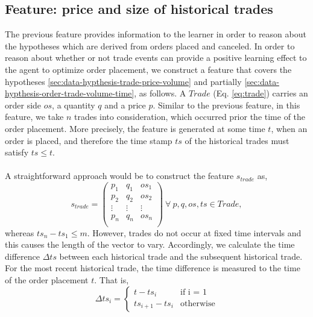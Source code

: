 \subsection{Feature: price and size of historical trades}
\label{sec:data-feature-2}
The previous feature provides information to the learner in order to reason about the hypotheses which are derived from orders placed and canceled.
In order to reason about whether or not trade events can provide a positive learning effect to the agent to optimize order placement, we construct a feature that covers the hypotheses \ref{sec:data-hypthesis-trade-price-volume} and partially \ref{sec:data-hypthesis-order-trade-volume-time}, as follows.
A $Trade$ (Eq. \ref{eq:trade}) carries an order side $os$, a quantity $q$ and a price $p$.
Similar to the previous feature, in this feature, we take $n$ trades into consideration, which occurred prior the time of the order placement.
More precisely, the feature is generated at some time $t$, when an order is placed, and therefore the time stamp $ts$ of the historical trades must satisfy $ts \leq t$.
\\
\\
A straightforward approach would be to construct the feature $s_{trade}$ as,
\begin{equation}
    s_{trade} =\begin{pmatrix}
        p_1 & q_1 & os_1 \\
        p_2 & q_2 & os_2 \\
        \vdots & \vdots & \vdots\\
        p_n & q_n & os_n \\
    \end{pmatrix}
    \ \forall \ p, q, os, ts \in Trade,
\end{equation}
whereas $ts_n - ts_1 \leq m$.
However, trades do not occur at fixed time intervals and this causes the length of the vector to vary.
Accordingly, we calculate the time difference $\Delta{ts}$ between each historical trade and the subsequent historical trade.
For the most recent historical trade, the time difference is measured to the time of the order placement $t$.
That is,
\begin{equation}
    \Delta{ts}_i = \begin{cases}
    t - ts_i &\text{if i = 1}\\
    ts_{i+1} - ts_i &\text{otherwise}
    \end{cases}
\end{equation}

